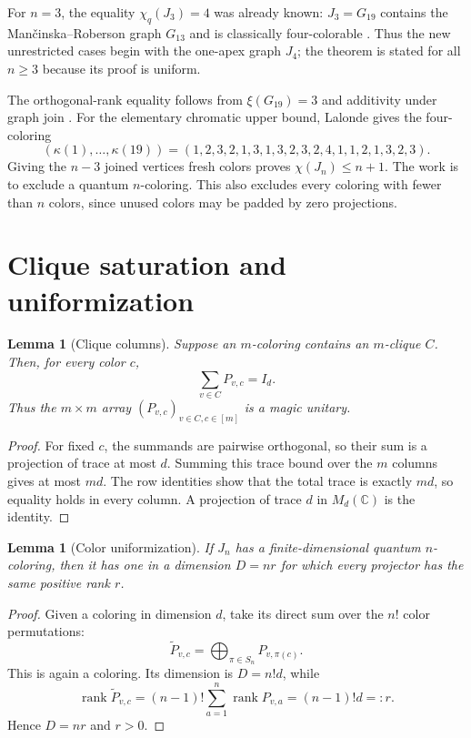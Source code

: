\documentclass[11pt]{article}
\newtheorem{lemma}[theorem]{Lemma}
\newcommand{\C}{\mathbb C}
\newcommand{\rank}{\operatorname{rank}}
\newcommand{\id}{I}
\begin{document}
For $n=3$, the equality $\chi_q(J_3)=4$ was already known: $J_3=G_{19}$
contains the Man\v{c}inska--Roberson graph $G_{13}$ and is classically
four-colorable \cite[Section~4.2]{Lalonde2026}.  Thus the new unrestricted
cases begin with the one-apex graph $J_4$; the theorem is stated for all
$n\geq3$ because its proof is uniform.

The orthogonal-rank equality follows from $\xi(G_{19})=3$
\cite[Theorem~1.6]{Lalonde2026} and additivity under graph join
\cite[Theorem~2.17(5)]{Lalonde2026}.  For the elementary chromatic upper
bound, Lalonde gives the four-coloring \cite[Section~4.2]{Lalonde2026}
\[
 (\kappa(1),\ldots,\kappa(19))
 =(1,2,3,2,1,3,1,3,2,3,2,4,1,1,2,1,3,2,3).
\]
Giving the $n-3$ joined vertices fresh colors proves $\chi(J_n)\leq n+1$.
The work is to exclude a quantum $n$-coloring.  This also excludes every
coloring with fewer than $n$ colors, since unused colors may be padded by
zero projections.

\section{Clique saturation and uniformization}

\begin{lemma}[Clique columns]\label{lem:clique}
Suppose an $m$-coloring contains an $m$-clique $C$.  Then, for every color
$c$,
\[
        \sum_{v\in C}P_{v,c}=\id_d.
\]
Thus the $m\times m$ array $(P_{v,c})_{v\in C,c\in[m]}$ is a magic unitary.
\end{lemma}

\begin{proof}
For fixed $c$, the summands are pairwise orthogonal, so their sum is a
projection of trace at most $d$.  Summing this trace bound over the $m$
columns gives at most $md$.  The row identities show that the total trace is
exactly $md$, so equality holds in every column.  A projection of trace $d$
in $M_d(\C)$ is the identity.
\end{proof}

\begin{lemma}[Color uniformization]\label{lem:uniform}
If $J_n$ has a finite-dimensional quantum $n$-coloring, then it has one in a
dimension $D=nr$ for which every projector has the same positive rank $r$.
\end{lemma}

\begin{proof}
Given a coloring in dimension $d$, take its direct sum over the $n!$ color
permutations:
\[
 \widetilde P_{v,c}=\bigoplus_{\pi\in S_n}P_{v,\pi(c)}.
\]
This is again a coloring.  Its dimension is $D=n!d$, while
\[
 \rank \widetilde P_{v,c}
  =(n-1)!\sum_{a=1}^n\rank P_{v,a}=(n-1)!d=:r.
\]
Hence $D=nr$ and $r>0$.
\end{proof}
\end{document}
